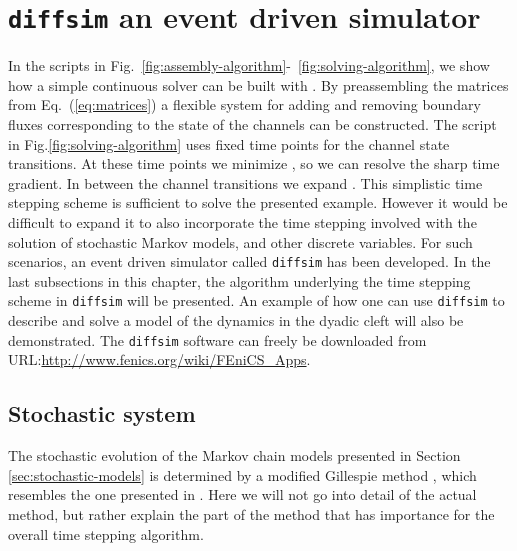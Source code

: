 \section{\texttt{diffsim} an event driven simulator}
\label{sec:diffsim}
In the scripts in Fig.~\ref{fig:assembly-algorithm}-~\ref{fig:solving-algorithm}, we show how a simple continuous solver can be built with \pydolfin. By preassembling the matrices from Eq.~(\ref{eq:matrices}) a flexible system for adding and removing boundary fluxes corresponding to the state of the channels can be constructed. The script in Fig.\ref{fig:solving-algorithm} uses fixed time points for the channel state transitions. At these time points we minimize \Dt, so we can resolve the sharp time gradient. In between the channel transitions we expand \Dt. This simplistic time stepping scheme is sufficient to solve the presented example. However it would be difficult to expand it to also incorporate the time stepping involved with the solution of stochastic Markov models, and other discrete variables. For such scenarios, an event driven simulator called \texttt{diffsim} has been developed. In the last subsections in this chapter, the algorithm underlying the time stepping scheme in \texttt{diffsim} will be presented. An example of how one can use \texttt{diffsim} to describe and solve a model of the \Ca dynamics in the dyadic cleft will also be demonstrated. The \texttt{diffsim} software can freely be downloaded from URL:\url{http://www.fenics.org/wiki/FEniCS_Apps}.\par

\subsection*{Stochastic system}
\label{sec:stochastic-system}
The stochastic evolution of the Markov chain models presented in Section \ref{sec:stochastic-models} is determined by a modified Gillespie method \cite{Gillespie1977}, which resembles the one presented in \citet{RudigerShuaiHuisingaEtAl2007}. Here we will not go into detail of the actual method, but rather explain the part of the method that has importance for the overall time stepping algorithm.\par


